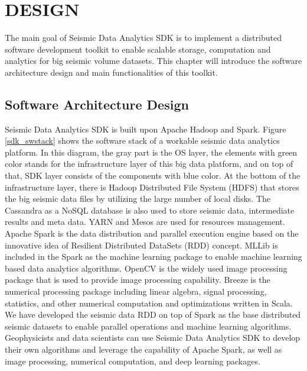%
%
%

\chapter{\uppercase{Design}}

The main goal of Seismic Data Analytics SDK is to implement a distributed software development toolkit to enable scalable storage, computation and analytics for big seismic volume datasets. This chapter will introduce the software architecture design and main functionalities of this toolkit.

\section{Software Architecture Design}

Seismic Data Analytics SDK is built upon Apache Hadoop and Spark. Figure \ref{sdk_swstack} shows the software stack of a workable seismic data analytics platform. In this diagram, the gray part is the OS layer, the elements with green color stands for the infrastructure layer of this big data platform, and on top of that, SDK layer consists of the components with blue color. At the bottom of the infrastructure layer, there is Hadoop Distributed File System (HDFS) that stores the big seismic data files by utilizing the large number of local disks. The Cassandra as a NoSQL database is also used to store  seismic data, intermediate results and meta data. YARN and Mesos are used for resources management. Apache Spark is the data distribution and parallel execution engine based on the innovative idea of Resilient Distributed DataSets (RDD) concept. MLLib is included in the Spark as the machine learning package to enable machine learning based data analytics algorithms. OpenCV is the widely used image processing package that is used to provide image processing capability. Breeze is the numerical processing package including linear algebra, signal processing, statistics, and other numerical computation and optimizations written in Scala. We have developed the seismic data RDD on top of Spark as the base distributed seismic datasets to enable parallel operations and machine learning algorithms. Geophysicists and data scientists can use  Seismic Data Analytics SDK to develop their own algorithms and leverage the capability of Apache Spark, as well as image processing, numerical computation, and deep learning packages.


